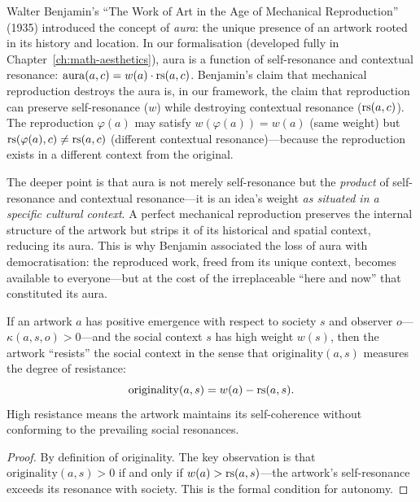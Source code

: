 \begin{remark}
\label{rem:benjamin-aura}
Walter Benjamin's ``The Work of Art in the Age of Mechanical Reproduction'' (1935) introduced the concept of \emph{aura}: the unique presence of an artwork rooted in its history and location.  In our formalisation (developed fully in Chapter~\ref{ch:math-aesthetics}), aura is a function of self-resonance and contextual resonance: $\mathrm{aura}(a, c) = w(a) \cdot \mathrm{rs}(a, c)$.  Benjamin's claim that mechanical reproduction destroys the aura is, in our framework, the claim that reproduction can preserve self-resonance ($w$) while destroying contextual resonance ($\mathrm{rs}(a, c)$).  The reproduction $\varphi(a)$ may satisfy $w(\varphi(a)) = w(a)$ (same weight) but $\mathrm{rs}(\varphi(a), c) \neq \mathrm{rs}(a, c)$ (different contextual resonance)---because the reproduction exists in a different context from the original.

The deeper point is that aura is not merely self-resonance but the \emph{product} of self-resonance and contextual resonance---it is an idea's weight \emph{as situated in a specific cultural context}.  A perfect mechanical reproduction preserves the internal structure of the artwork but strips it of its historical and spatial context, reducing its aura.  This is why Benjamin associated the loss of aura with democratisation: the reproduced work, freed from its unique context, becomes available to everyone---but at the cost of the irreplaceable ``here and now'' that constituted its aura.
\end{remark}

\begin{theorem}
\label{thm:aesthetic-resistance}
If an artwork $a$ has positive emergence with respect to society $s$ and observer $o$---$\kappa(a, s, o) > 0$---and the social context $s$ has high weight $w(s)$, then the artwork ``resists'' the social context in the sense that $\mathrm{originality}(a, s)$ measures the degree of resistance:
\[
  \mathrm{originality}(a, s) = w(a) - \mathrm{rs}(a, s).
\]
High resistance means the artwork maintains its self-coherence without conforming to the prevailing social resonances.
\end{theorem}

\begin{proof}
By definition of originality.  The key observation is that $\mathrm{originality}(a, s) > 0$ if and only if $w(a) > \mathrm{rs}(a, s)$---the artwork's self-resonance exceeds its resonance with society.  This is the formal condition for autonomy.
\end{proof}

